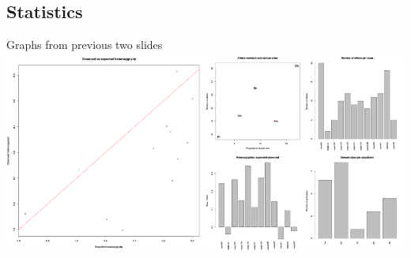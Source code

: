 \documentclass[compress, ucs, xelatex, 11pt, xcolor=svgnames,
  hyperref={
    bookmarks=true,
    unicode=true,
    colorlinks=true,
    pdftitle={Molecular data in R},
    plainpages=false,
    pdfauthor={Vojtech Zeisek},
    pdfsubject={Course about phylogeny and evolution in R},
    pdfcreator={XeLaTeX},
    pdfkeywords={R, evolution, phylogeny, molecular data},
    linkcolor=Tomato,
    anchorcolor=SaddleBrown,
    citecolor=Goldenrod,
    filecolor=DarkMagenta,
    menucolor=Sienna,
    urlcolor=DarkTurquoise,
    pdftex},
  url={hyphens, lowtilde} %
  ]{beamer}
\begin{document}
\subsection{Statistics}

\begin{frame}{Graphs from previous two slides}
  \includegraphics[width=\textwidth]{heterozygosity.png}
\end{frame}
\end{document}
